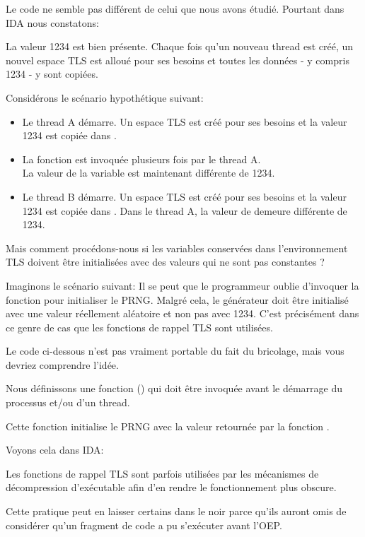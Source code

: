 Le code ne semble pas différent de celui que nous avons étudié. Pourtant dans IDA nous constatons:



La valeur 1234 est bien présente. Chaque fois qu'un nouveau thread est créé, un nouvel espace \ac{TLS} 
est alloué pour ses besoins et toutes les données - y compris 1234 - y sont copiées.

Considérons le scénario hypothétique suivant:

\begin{itemize}
\item Le thread A démarre. Un espace \ac{TLS} est créé pour ses besoins et la valeur 1234 est copiée 
dans .

\item La fonction  est invoquée plusieurs fois par le thread A.\\
La valeur de la variable  est maintenant différente de 1234.

\item Le thread B démarre. Un espace \ac{TLS} est créé pour ses besoins et la valeur 1234 est copiée 
dans . Dans le thread A, la valeur de  demeure différente de 1234.
\end{itemize}


Mais comment procédons-nous si les variables conservées dans l'environnement \ac{TLS} doivent être 
initialisées avec des valeurs qui ne sont pas constantes ?

Imaginons le scénario suivant:
Il se peut que le programmeur oublie d'invoquer la fonction  pour initialiser le 
\ac{PRNG}. Malgré cela, le générateur doit être initialisé avec une valeur réellement aléatoire et 
non pas avec 1234. C'est précisément dans ce genre de cas que les fonctions de rappel \ac{TLS} 
sont utilisées.

Le code ci-dessous n'est pas vraiment portable du fait du bricolage, mais vous devriez comprendre 
l'idée.

Nous définissons une fonction () qui doit être invoquée avant le démarrage du 
processus et/ou d'un thread.

Cette fonction initialise le \ac{PRNG} avec la valeur retournée par la fonction .



Voyons cela dans IDA:



Les fonctions de rappel TLS sont parfois utilisées par les mécanismes de décompression d'exécutable 
afin d'en rendre le fonctionnement plus obscure.

Cette pratique peut en laisser certains dans le noir parce qu'ils auront omis de considérer qu'un 
fragment de code a pu s'exécuter avant l'\ac{OEP}.
